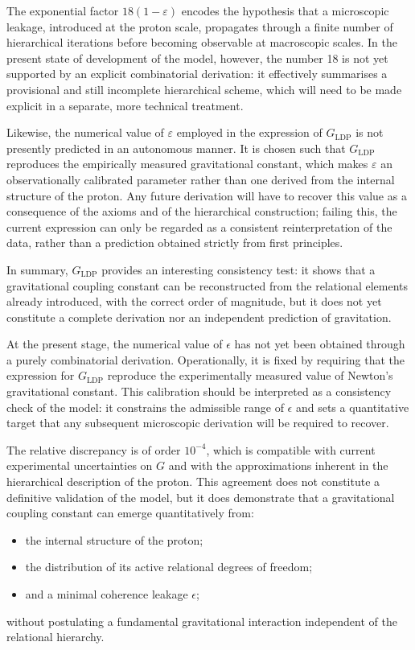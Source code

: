 \documentclass[11pt,a4paper]{article}
\begin{document}
The exponential factor \(18(1-\varepsilon)\) encodes the hypothesis that a microscopic leakage, introduced at the proton scale, propagates through a finite number of hierarchical iterations before becoming observable at macroscopic scales. In the present state of development of the model, however, the number 18 is not yet supported by an explicit combinatorial derivation: it effectively summarises a provisional and still incomplete hierarchical scheme, which will need to be made explicit in a separate, more technical treatment.

Likewise, the numerical value of \(\varepsilon\) employed in the expression of \(G_{\mathrm{LDP}}\) is not presently predicted in an autonomous manner. It is chosen such that \(G_{\mathrm{LDP}}\) reproduces the empirically measured gravitational constant, which makes \(\varepsilon\) an observationally calibrated parameter rather than one derived from the internal structure of the proton. Any future derivation will have to recover this value as a consequence of the axioms and of the hierarchical construction; failing this, the current expression can only be regarded as a consistent reinterpretation of the data, rather than a prediction obtained strictly from first principles.

In summary, \(G_{\mathrm{LDP}}\) provides an interesting consistency test: it shows that a gravitational coupling constant can be reconstructed from the relational elements already introduced, with the correct order of magnitude, but it does not yet constitute a complete derivation nor an independent prediction of gravitation. 

At the present stage, the numerical value of \(\epsilon\) has not yet been obtained through a purely combinatorial derivation. Operationally, it is fixed by requiring that the expression for \(G_{\mathrm{LDP}}\) reproduce the experimentally measured value of Newton’s gravitational constant. This calibration should be interpreted as a consistency check of the model: it constrains the admissible range of \(\epsilon\) and sets a quantitative target that any subsequent microscopic derivation will be required to recover. 

The relative discrepancy is of order \(10^{-4}\), which is compatible with current experimental uncertainties on \(G\) and with the approximations inherent in the hierarchical description of the proton. This agreement does not constitute a definitive validation of the model, but it does demonstrate that a gravitational coupling constant can emerge quantitatively from:
\begin{itemize}[label=-]
  \item the internal structure of the proton;
  \item the distribution of its active relational degrees of freedom;
  \item and a minimal coherence leakage \(\epsilon\);
\end{itemize}
without postulating a fundamental gravitational interaction independent of the relational hierarchy. 
\end{document}
